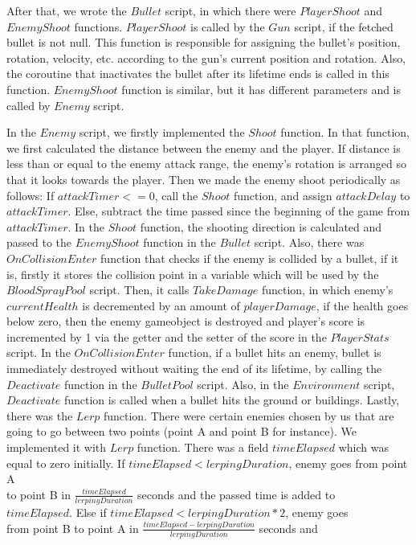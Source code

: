 \documentclass[a4paper]{article}
\begin{document}
\begin{minipage}{\dimexpr\textwidth-1cm}
\hspace{0.5cm} After that, we wrote the $Bullet$ script, in which there were $PlayerShoot$ and $EnemyShoot$ functions. $PlayerShoot$ is called by the $Gun$ script, if the fetched bullet is not null. This function is responsible for assigning the bullet's position, rotation, velocity, etc. according to the gun's current position and rotation. Also, the coroutine that inactivates the bullet after its lifetime ends is called in this function. $EnemyShoot$ function is similar, but it has different parameters and is called by $Enemy$ script.\\
\end{minipage}

\newpage

\begin{minipage}{\dimexpr\textwidth-1cm}
\hspace{0.5cm} In the $Enemy$ script, we firstly implemented the $Shoot$ function. In that function, we first calculated the distance between the enemy and the player. If distance is less than or equal to the enemy attack range, the enemy's rotation is arranged so that it looks towards the player. Then we made the enemy shoot periodically as follows: If $attackTimer <= 0$, call the $Shoot$ function, and assign $attackDelay$ to $attackTimer$. Else, subtract the time passed since the beginning of the game from $attackTimer$. In the $Shoot$ function, the shooting direction is calculated and passed to the $EnemyShoot$ function in the $Bullet$ script. Also, there was $OnCollisionEnter$ function that checks if the enemy is collided by a bullet, if it is, firstly it stores the collision point in a variable which will be used by the $BloodSprayPool$ script. Then, it calls $TakeDamage$ function, in which enemy's $currentHealth$ is decremented by an amount of $playerDamage$, if the health goes below zero, then the enemy gameobject is destroyed and player's score is incremented by 1 via the getter and the setter of the score in the $PlayerStats$ script. In the $OnCollisionEnter$ function, if a bullet hits an enemy, bullet is immediately destroyed without waiting the end of its lifetime, by calling the $Deactivate$ function in the $BulletPool$ script. Also, in the $Environment$ script, $Deactivate$ function is called when a bullet hits the ground or buildings. Lastly, there was the $Lerp$ function. There were certain enemies chosen by us that are going to go between two points (point A and point B for instance). We implemented it with $Lerp$ function. There was a field $timeElapsed$ which was equal to zero initially. If $timeElapsed < lerpingDuration$, enemy goes from point A\vspace{0.3cm}\\ to point B in $\frac{timeElapsed}{lerpingDuration}$ seconds and the passed time is added to\vspace{0.3cm}\\ $timeElapsed$. Else if $timeElapsed < lerpingDuration * 2$, enemy goes\vspace{0.3cm}\\ from point B to point A in $\frac{timeElapsed-lerpingDuration}{lerpingDuration}$ seconds and 
\end{minipage}
\end{document}
